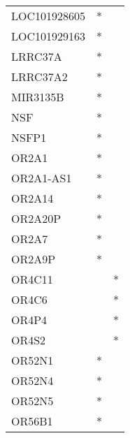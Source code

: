 \begin{longtable}{lcc}
LOC101928605 &              * &            \\
LOC101929163 &              * &            \\
LRRC37A      &              * &            \\
LRRC37A2     &              * &            \\
MIR3135B     &              * &            \\
NSF          &              * &            \\
NSFP1        &              * &            \\
OR2A1        &              * &            \\
OR2A1-AS1    &              * &            \\
OR2A14       &              * &            \\
OR2A20P      &              * &            \\
OR2A7        &              * &            \\
OR2A9P       &              * &            \\
OR4C11       &                &          * \\
OR4C6        &                &          * \\
OR4P4        &                &          * \\
OR4S2        &                &          * \\
OR52N1       &              * &            \\
OR52N4       &              * &            \\
OR52N5       &              * &            \\
OR56B1       &              * &            \\
\end{longtable}
